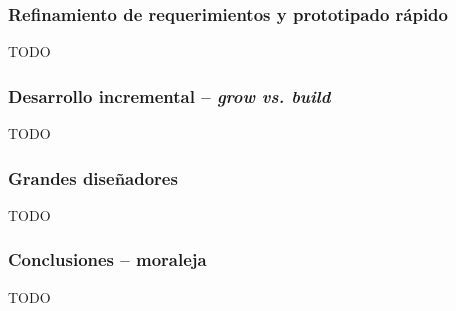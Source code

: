 \documentclass{beamer}
\begin{document}
\begin{frame}[fragile]
  \frametitle{Refinamiento de requerimientos y prototipado r\'apido}
  TODO
\end{frame}


\begin{frame}[fragile]
  \frametitle{Desarrollo incremental -- \textit{grow vs. build}}
  TODO
\end{frame}

\begin{frame}[fragile]
  \frametitle{Grandes dise\~nadores}
  TODO
\end{frame}

\begin{frame}[fragile]
  \frametitle{Conclusiones -- moraleja}
  TODO
\end{frame}
\end{document}

